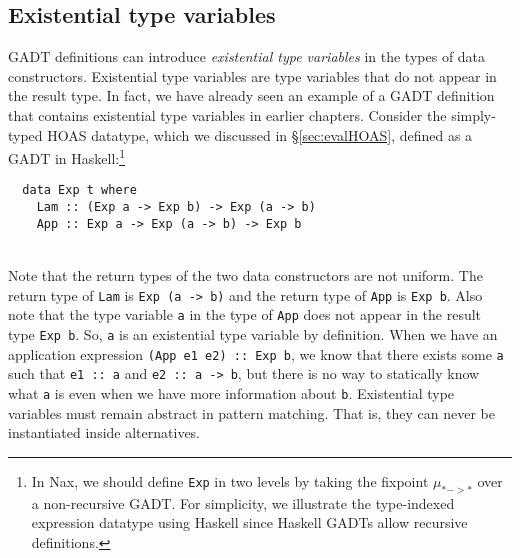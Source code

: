 \subsection{Existential type variables}
\label{sec:naxTyInfer:gadt:ex}
GADT definitions can introduce \emph{existential type variables}
in the types of data constructors. Existential type variables are
type variables that do not appear in the result type. In fact,
we have already seen an example of a GADT definition that contains
existential type variables in earlier chapters. Consider
the simply-typed HOAS datatype, which we discussed in \S\ref{sec:evalHOAS},
defined as a GADT in Haskell:\footnote{
	In Nax, we should define \texttt{Exp} in two levels
	by taking the fixpoint $\mu_{* -> *}$ over a non-recursive GADT.
	For simplicity, we illustrate the type-indexed expression datatype
	using Haskell since Haskell GADTs allow recursive definitions.}
\vspace*{-5.2ex}
\begin{singlespace}
\begin{verbatim}
  data Exp t where
    Lam :: (Exp a -> Exp b) -> Exp (a -> b)
    App :: Exp a -> Exp (a -> b) -> Exp b
\end{verbatim}
\end{singlespace}
~\vspace*{-5.3ex}\\
Note that the return types of the two data constructors are not uniform.
The return type of \texttt{Lam} is \texttt{Exp (a -> b)} and
the return type of \texttt{App} is \texttt{Exp b}. Also note that
the type variable \texttt{a} in the type of \texttt{App} does not appear in
the result type \texttt{Exp b}. So, \texttt{a} is an existential type variable
by definition. When we have an application expression
\texttt{\;(App e1 e2)~::~Exp b}, we know that there exists some \texttt{a}
such that \texttt{\;e1~::~a\;} and \texttt{\;e2~::~a -> b}, but there is no way
to statically know what \texttt{a} is even when we have more information about
\texttt{b}. Existential type variables must remain abstract in pattern matching.
That is, they can never be instantiated inside alternatives.

